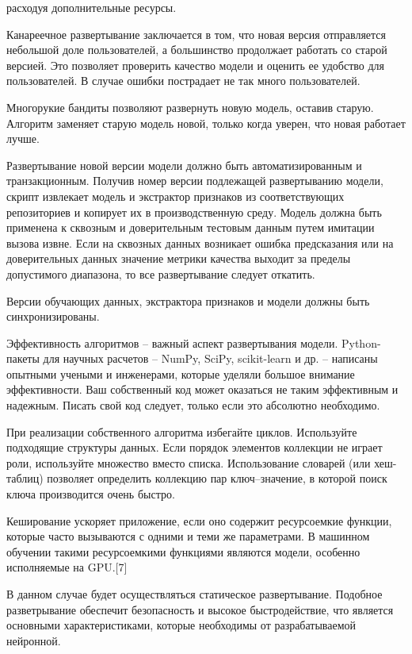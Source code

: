 {	расходуя дополнительные ресурсы.
	\par \redline  Канареечное развертывание заключается в том, что новая версия отправляется небольшой доле пользователей, а большинство продолжает работать со старой версией. Это позволяет проверить качество модели и оценить ее
	удобство для пользователей. В случае ошибки пострадает не так много пользователей.
	\par \redline  Многорукие бандиты позволяют развернуть новую модель, оставив старую. Алгоритм заменяет старую модель новой, только когда уверен, что новая
	работает лучше.
	\par \redline Развертывание новой версии модели должно быть автоматизированным
	и транзакционным. Получив номер версии подлежащей развертыванию модели, скрипт извлекает модель и экстрактор признаков из соответствующих
	репозиториев и копирует их в производственную среду. Модель должна быть
	применена к сквозным и доверительным тестовым данным путем имитации
	вызова извне. Если на сквозных данных возникает ошибка предсказания или
	на доверительных данных значение метрики качества выходит за пределы
	допустимого диапазона, то все развертывание следует откатить.
	\par \redline Версии обучающих данных, экстрактора признаков и модели должны быть
	синхронизированы.
	\par \redline Эффективность алгоритмов {--} важный аспект развертывания модели.
	Python-пакеты для научных расчетов – NumPy, SciPy, scikit-learn и др. – написаны опытными учеными и инженерами, которые уделяли большое внимание эффективности. Ваш собственный код может оказаться не таким эффективным и надежным. Писать свой код следует, только если это абсолютно
	необходимо.
	\par \redline При реализации собственного алгоритма избегайте циклов. Используйте подходящие структуры данных. Если порядок элементов коллекции не
	играет роли, используйте множество вместо списка. Использование словарей (или хеш-таблиц) позволяет определить коллекцию пар ключ–значение,
	в которой поиск ключа производится очень быстро.
	\par \redline Кеширование ускоряет приложение, если оно содержит ресурсоемкие
	функции, которые часто вызываются с одними и теми же параметрами. В машинном обучении такими ресурсоемкими функциями являются модели,
	особенно исполняемые на GPU.[7]
	
	\par \redline В данном случае будет осуществляться статическое развертывание. Подобное разветрывание обеспечит безопасность и высокое быстродействие, что является основными характеристиками, которые необходимы от разрабатываемой нейронной.
	
	 
	
	\par
}


